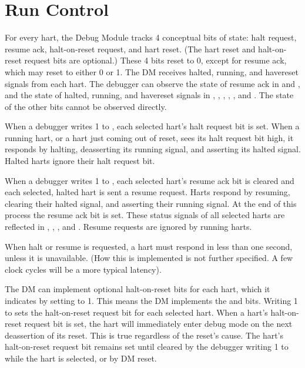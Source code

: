 \section{Run Control} \label{runcontrol}

For every hart, the Debug Module tracks 4 conceptual bits of state: halt
request, resume ack, halt-on-reset request,  and hart reset.
(The hart reset and halt-on-reset request bits are optional.)
These 4 bits reset to 0, except for resume ack, which may reset to either 0 or 1.
The DM receives halted, running, and havereset signals from each hart.
The debugger can observe the state of resume ack in \FdmDmstatusAllresumeack and
\FdmDmstatusAnyresumeack, and the state of halted, running, and havereset signals
in \FdmDmstatusAllhalted, \FdmDmstatusAnyhalted, \FdmDmstatusAllrunning, \FdmDmstatusAnyrunning, \FdmDmstatusAllhavereset,
and \FdmDmstatusAnyhavereset. The state of the other bits cannot be observed directly.

When a debugger writes 1 to \FdmDmcontrolHaltreq, each selected hart's halt request bit is
set.
When a running hart, or a hart just coming out of reset, sees its halt request
bit high, it responds by halting, deasserting its running signal, and asserting
its halted signal.
Halted harts ignore their halt request bit.

When a debugger writes 1 to \FdmDmcontrolResumereq, each selected hart's resume ack bit is
cleared and each selected, halted hart is sent a resume request. Harts respond
by resuming, clearing their halted signal, and asserting their running signal.
At the end of this process the resume ack bit is set.  These
status signals of all selected harts are reflected in \FdmDmstatusAllresumeack,
\FdmDmstatusAnyresumeack, \FdmDmstatusAllrunning, and \FdmDmstatusAnyrunning. Resume requests are ignored by
running harts.

When halt or resume is requested, a hart must respond in
less than one second, unless it is unavailable.
(How this is implemented is not further specified. A few
clock cycles will be a more typical latency).

The DM can implement optional halt-on-reset bits for each hart,
which it indicates by setting \FdmDmstatusHasresethaltreq to 1.
This means the DM implements the \FdmDmcontrolSetresethaltreq and \FdmDmcontrolClrresethaltreq bits.
Writing 1 to \FdmDmcontrolSetresethaltreq sets the halt-on-reset request bit for each
selected hart.
When a hart's halt-on-reset request bit is set, the hart will immediately enter
debug mode on the next deassertion of its reset. This is true regardless of
the reset's cause.
The hart's halt-on-reset request bit remains set
until cleared by the debugger writing 1 to \FdmDmcontrolClrresethaltreq
while the hart is selected, or by DM reset.


